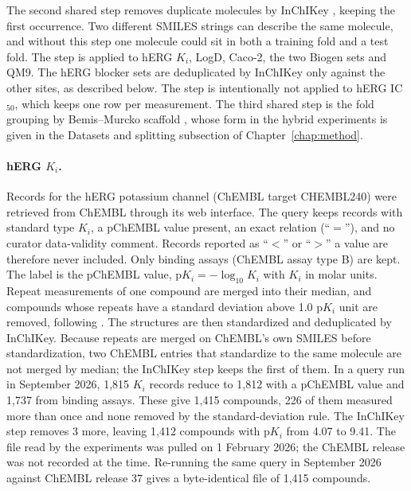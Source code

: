 The second shared step removes duplicate molecules by InChIKey \citep{Heller2015}, keeping the first occurrence. Two different SMILES strings can describe the same molecule, and without this step one molecule could sit in both a training fold and a test fold. The step is applied to hERG $K_i$, LogD, Caco-2, the two Biogen sets and QM9. The hERG blocker sets are deduplicated by InChIKey only against the other sites, as described below. The step is intentionally not applied to hERG IC$_{50}$, which keeps one row per measurement. The third shared step is the fold grouping by Bemis--Murcko scaffold \citep{Bemis1996}, whose form in the hybrid experiments is given in the Datasets and splitting subsection of Chapter~\ref{chap:method}.

\paragraph{\texorpdfstring{hERG $K_i$.}{hERG Ki.}} Records for the hERG potassium channel (ChEMBL target CHEMBL240) were retrieved from ChEMBL \citep{Zdrazil2023} through its web interface. The query keeps records with standard type $K_i$, a pChEMBL value present, an exact relation (``$=$''), and no curator data-validity comment. Records reported as ``$<$'' or ``$>$'' a value are therefore never included. Only binding assays (ChEMBL assay type B) are kept. The label is the pChEMBL value, $\mathrm{p}K_i = -\log_{10} K_i$ with $K_i$ in molar units. Repeat measurements of one compound are merged into their median, and compounds whose repeats have a standard deviation above 1.0 p$K_i$ unit are removed, following \citet{landrum2024}. The structures are then standardized and deduplicated by InChIKey. Because repeats are merged on ChEMBL's own SMILES before standardization, two ChEMBL entries that standardize to the same molecule are not merged by median; the InChIKey step keeps the first of them. In a query run in September 2026, 1,815 $K_i$ records reduce to 1,812 with a pChEMBL value and 1,737 from binding assays. These give 1,415 compounds, 226 of them measured more than once and none removed by the standard-deviation rule. The InChIKey step removes 3 more, leaving 1,412 compounds with p$K_i$ from 4.07 to 9.41. The file read by the experiments was pulled on 1 February 2026; the ChEMBL release was not recorded at the time. Re-running the same query in September 2026 against ChEMBL release 37 gives a byte-identical file of 1,415 compounds.

